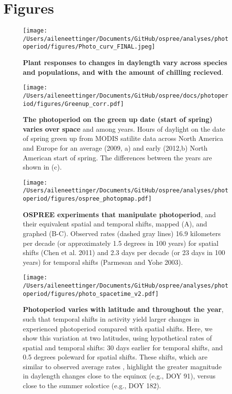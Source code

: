 \documentclass{article}
\begin{document}
\section* {Figures}
\begin{figure}[p]
\texttt{[image: /Users/aileneettinger/Documents/GitHub/ospree/analyses/photoperiod/figures/Photo\_curv\_FINAL.jpeg]} 
\caption{\textbf{Plant responses to changes in daylength vary across species and populations, and with the amount of chilling recieved}.}
 \label{fig:photocurve}
 \end{figure}

\begin{figure}[p]
\centering
\texttt{[image: /Users/aileneettinger/Documents/GitHub/ospree/docs/photoperiod/figures/Greenup\_corr.pdf]} %
\caption{\textbf{The photoperiod on the green up date (start of spring) varies over space} and among years. Hours of daylight on the date of spring green up from MODIS satilite data across North America and Europe for an average (2009, a) and  early (2012,b) North American start of spring. The differences between the years are shown in (c). }
 \label{fig:greenup}%
 \end{figure}
\begin{figure}[p]
\centering
\texttt{[image: /Users/aileneettinger/Documents/GitHub/ospree/analyses/photoperiod/figures/ospree\_photopmap.pdf]} 
\caption{\textbf{OSPREE experiments that manipulate photoperiod}, and their equivalent spatial and temporal shifts, mapped (A), and graphed (B-C). Observed rates (dashed gray lines) 16.9 kilometers per decade (or approximately 1.5 degrees in 100 years) for spatial shifts (Chen et al. 2011) and 2.3 days per decade (or 23 days in 100 years) for temporal shifts (Parmesan and Yohe 2003).}
 \label{fig:photomap}
 \end{figure}


 
\begin{figure}[p]
\centering
\texttt{[image: /Users/aileneettinger/Documents/GitHub/ospree/analyses/photoperiod/figures/photo\_spacetime\_v2.pdf]} %
\caption{\textbf{Photoperiod varies with latitude and throughout the year}, such that temporal shifts in activity yield larger changes in experienced photoperiod compared with spatial shifts. Here, we show this variation at two latitudes, using hypothetical rates of spatial and temporal shifts: 30 days earlier for temporal shifts, and 0.5 degrees poleward for spatial shifts. These shifts, which are similar to observed average rates \citep[][e.g.,]{parmesan2006,chen2011}, highlight the greater magnitude in daylength changes close to the equinox (e.g., DOY 91), versus close to the summer solcstice (e.g., DOY 182).}
 \label{fig:spacetime}%
 \end{figure}
 
\end{document}
